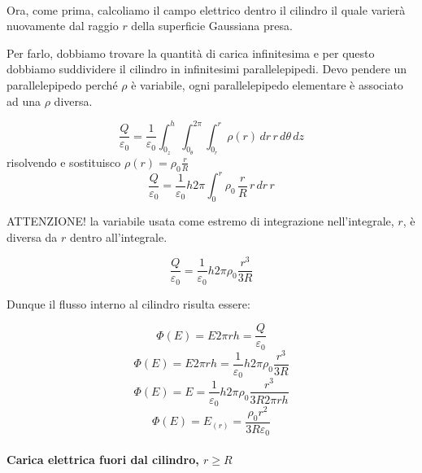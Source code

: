 \paragraph{}
Ora, come prima, calcoliamo il campo elettrico dentro il cilindro il quale varierà nuovamente dal raggio $r$ della superficie Gaussiana presa.

Per farlo, dobbiamo trovare la quantità di carica infinitesima e per questo dobbiamo suddividere il cilindro in infinitesimi parallelepipedi. 
Devo pendere un parallelepipedo perché $\rho$ è variabile, ogni parallelepipedo elementare è associato ad una $\rho$ diversa.

\begin{equation*}
    \frac{Q}{\varepsilon_0} = \frac{1}{\varepsilon_0} \int_{0_z}^h \int_{0_\theta} ^{2\pi} \int_{0_r}^r {\rho(r)\,dr\,r\,d\theta\,dz}
\end{equation*}
risolvendo e sostituisco $ \rho(r) = \rho_0\frac{r}{R}$ 
\begin{equation*}
    \frac{Q}{\varepsilon_0} = \frac{1}{\varepsilon_0} h 2\pi \int_0^r \rho_0\,\frac{r}{R}\,r\,dr\,r
\end{equation*}

ATTENZIONE! la variabile usata come estremo di integrazione nell'integrale, $r$, è diversa da $r$ dentro all'integrale.

\begin{equation}
    \frac{Q}{\varepsilon_0} = \frac{1}{\varepsilon_0} h 2\pi \rho_0\frac{r^3}{3R}
\end{equation}

Dunque il flusso interno al cilindro risulta essere:

\begin{equation*}
    \Phi(E) = E2\pi rh = \frac{Q}{\varepsilon_0}
\end{equation*}
\begin{equation*}
    \Phi(E) = E2\pi rh = \frac{1}{\varepsilon_0} h 2\pi \rho_0\frac{r^3}{3R}
\end{equation*}
\begin{equation*}
    \Phi(E) = E = \frac{1}{\varepsilon_0} h 2\pi \rho_0\frac{r^3}{3R 2\pi rh}
\end{equation*}
\begin{equation}
    \Phi(E) = E_{(r)} = \frac{\rho_0 r^2}{3R\varepsilon_0}
\end{equation}

\paragraph{Carica elettrica fuori dal cilindro, $r\ge R$}

